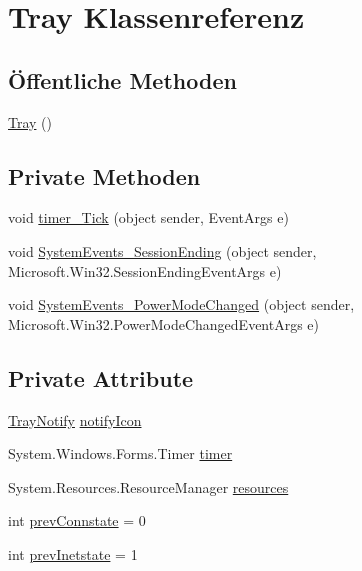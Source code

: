 \hypertarget{classQbeTray_1_1Tray}{
\section{Tray Klassenreferenz}
\label{classQbeTray_1_1Tray}
}
\subsection*{\"{O}ffentliche Methoden}
\begin{CompactItemize}
\item 
\hyperlink{classQbeTray_1_1Tray_QbeTray_1_1Traya0}{Tray} ()
\end{CompactItemize}
\subsection*{Private Methoden}
\begin{CompactItemize}
\item 
void \hyperlink{classQbeTray_1_1Tray_QbeTray_1_1Trayd0}{timer\_\-Tick} (object sender, Event\-Args e)
\item 
void \hyperlink{classQbeTray_1_1Tray_QbeTray_1_1Trayd1}{System\-Events\_\-Session\-Ending} (object sender, Microsoft.Win32.Session\-Ending\-Event\-Args e)
\item 
void \hyperlink{classQbeTray_1_1Tray_QbeTray_1_1Trayd2}{System\-Events\_\-Power\-Mode\-Changed} (object sender, Microsoft.Win32.Power\-Mode\-Changed\-Event\-Args e)
\end{CompactItemize}
\subsection*{Private Attribute}
\begin{CompactItemize}
\item 
\hyperlink{classQbeTray_1_1TrayNotify}{Tray\-Notify} \hyperlink{classQbeTray_1_1Tray_QbeTray_1_1Trayr0}{notify\-Icon}
\item 
System.Windows.Forms.Timer \hyperlink{classQbeTray_1_1Tray_QbeTray_1_1Trayr1}{timer}
\item 
System.Resources.Resource\-Manager \hyperlink{classQbeTray_1_1Tray_QbeTray_1_1Trayr2}{resources}
\item 
int \hyperlink{classQbeTray_1_1Tray_QbeTray_1_1Trayr3}{prev\-Connstate} = 0
\item 
int \hyperlink{classQbeTray_1_1Tray_QbeTray_1_1Trayr4}{prev\-Inetstate} = 1
\end{CompactItemize}


